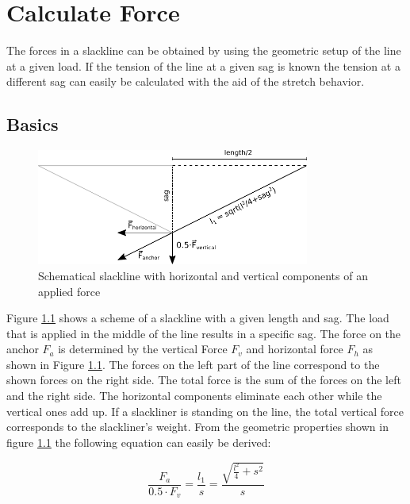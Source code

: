 
\chapter{Calculate Force} \label{sec:calculateForce}
The forces in a slackline can be obtained by using the geometric setup of the line at a given load. If the tension of the line at a given sag is known the tension at a different sag can easily be calculated with the aid of the stretch behavior.

\section{Basics} \label{sec:basics}

\begin{figure}[htb] \centering
	\includegraphics[width=0.8\textwidth]{images/slacklineWithForces.pdf}
	\caption{Schematical slackline with horizontal and vertical components of an applied force}
	\label{fig:slacklineWithForces}
\end{figure}

Figure \ref{fig:slacklineWithForces} shows a scheme of a slackline with a given length and sag. The load that is applied in the middle of the line results in a specific sag. The force on the anchor $F_a$ is determined by the vertical Force $F_v$ and horizontal force $F_h$ as shown in Figure \ref{fig:slacklineWithForces}. The forces on the left part of the line correspond to the shown forces on the right side. The total force is the sum of the forces on the left and the right side. The horizontal components eliminate each other while the vertical ones add up. If a slackliner is standing on the line, the total vertical force corresponds to the slackliner's weight. From the geometric properties shown in figure \ref{fig:slacklineWithForces} the following equation can easily be derived:


\begin{equation}
	\frac{F_a}{0.5\cdot F_v} = \frac{l_1}{s} = \frac{\sqrt{\frac{l^2}{4} + s^2}}{s}
\end{equation}

